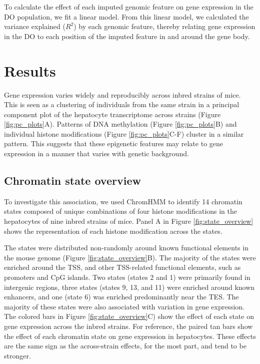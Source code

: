\documentclass[10pt,letterpaper]{article}
\begin{document}
To calculate the effect of each imputed genomic feature on gene
expression in the DO population, we fit a linear model. From this linear
model, we calculated the variance explained (\(R^2\)) by each genomic
feature, thereby relating gene expression in the DO to each position of
the imputed feature in and around the gene body.

\hypertarget{results}{%
\section{Results}\label{results}}

Gene expression varies widely and reproducibly across inbred strains of
mice. This is seen as a clustering of individuals from the same strain
in a principal component plot of the hepatocyte transcriptome across
strains (Figure \ref{fig:pc_plots}A). Patterns of DNA methylation
(Figure \ref{fig:pc_plots}B) and individual histone modifications
(Figure \ref{fig:pc_plots}C-F) cluster in a similar pattern. This
suggests that these epigenetic features may relate to gene expression in
a manner that varies with genetic background.

\hypertarget{chromatin-state-overview}{%
\subsection{Chromatin state overview}\label{chromatin-state-overview}}

To investigate this association, we used ChromHMM to identify 14
chromatin states composed of unique combinations of four histone
modifications in the hepatocytes of nine inbred strains of mice. Panel A
in Figure \ref{fig:state_overview} shows the representation of each
histone modification across the states.

The states were distributed non-randomly around known functional
elements in the mouse genome (Figure \ref{fig:state_overview}B). The
majority of the states were enriched around the TSS, and other
TSS-related functional elements, such as promoters and CpG islands. Two
states (states 2 and 1) were primarily found in intergenic regions,
three states (states 9, 13, and 11) were enriched around known
enhancers, and one (state 6) was enriched predominantly near the TES.
The majority of these states were also associated with variation in gene
expression. The colored bars in Figure \ref{fig:state_overview}C) show
the effect of each state on gene expression across the inbred strains.
For reference, the paired tan bars show the effect of each chromatin
state on gene expression in hepatocytes. These effects are the same sign
as the across-strain effects, for the most part, and tend to be
stronger.
\end{document}
